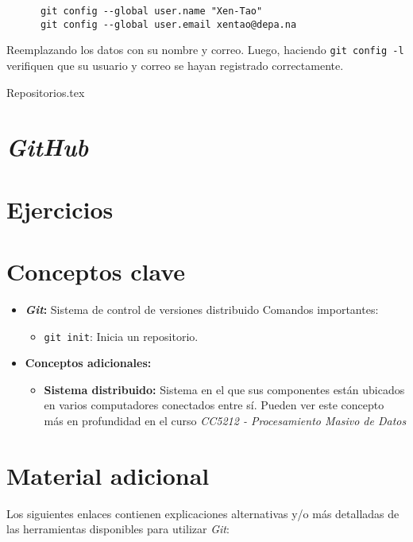     \begin{verbatim}
      git config --global user.name "Xen-Tao"
      git config --global user.email xentao@depa.na
    \end{verbatim}

    Reemplazando los datos con su nombre y correo.
    Luego, haciendo \texttt{git config -l} verifiquen que su usuario y correo se
    hayan registrado correctamente.

  {Repositorios.tex}

  \section{\textit{GitHub}}
    \label{sec:github}

  \section{Ejercicios}
  \section{Conceptos clave}
    \begin{itemize}
      \item \textbf{\textit{Git}:} Sistema de control de versiones distribuido
        Comandos importantes:
        \begin{itemize}
          \item \texttt{git init}: Inicia un repositorio.
        \end{itemize}
      \item \textbf{Conceptos adicionales:}
        \begin{itemize}
          \item \textbf{Sistema distribuido:\label{kw:distr-sist}}
            Sistema en el que sus componentes están ubicados en varios computadores 
            conectados entre sí.
            Pueden ver este concepto más en profundidad en el curso \textit{CC5212 - 
            Procesamiento Masivo de Datos}
        \end{itemize} 
    \end{itemize}
  \section{Material adicional}
    Los siguientes enlaces contienen explicaciones alternativas y/o más detalladas de
    las herramientas disponibles para utilizar \textit{Git}:
    

